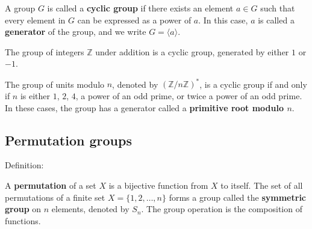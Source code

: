   A group $G$ is called a \textbf{cyclic group} if there exists an element $a \in G$ such that every element in $G$ can be expressed as a power of $a$. In this case, $a$ is called a \textbf{generator} of the group, and we write $G = \langle a \rangle$.


\begin{example}
  The group of integers $\mathbb{Z}$ under addition is a cyclic group, generated by either $1$ or $-1$.
\end{example}

\begin{example}
  The group of units modulo $n$, denoted by $(\mathbb{Z}/n\mathbb{Z})^*$, is a cyclic group if and only if $n$ is either $1$, $2$, $4$, a power of an odd prime, or twice a power of an odd prime. In these cases, the group has a generator called a \textbf{primitive root modulo $n$}.
\end{example}

\subsection{Permutation groups}
Definition:

  A \textbf{permutation} of a set $X$ is a bijective function from $X$ to itself. The set of all permutations of a finite set $X = \{1, 2, \dots, n\}$ forms a group called the \textbf{symmetric group} on $n$ elements, denoted by $S_n$. The group operation is the composition of functions.


